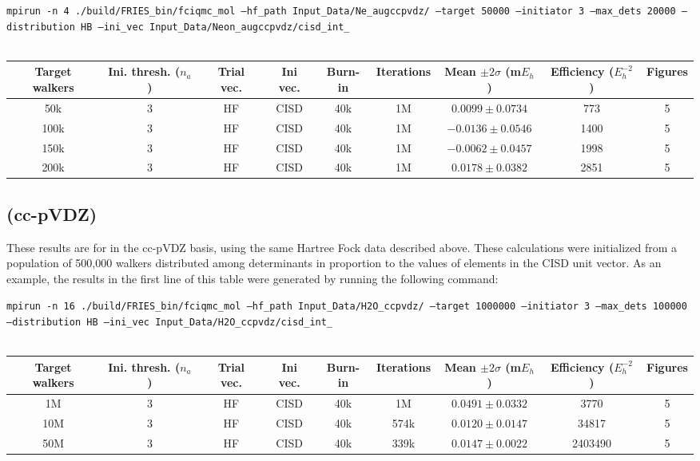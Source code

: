\documentclass[12pt, landscape]{article}
\begin{document}
\texttt{mpirun -n 4 ./build/FRIES\_bin/fciqmc\_mol --hf\_path Input\_Data/Ne\_augccpvdz/ --target 50000 --initiator 3 --max\_dets 20000 --distribution HB --ini\_vec Input\_Data/Neon\_augccpvdz/cisd\_int\_}
\\~\\
\begin{tabular}{c|c|c|c|c|c|c|c|c}
Target walkers & Ini. thresh. ($n_a$) & Trial vec. & Ini vec. & Burn-in & Iterations & Mean $\pm 2 \sigma$ (m$E_h$) & Efficiency ($E_h^{-2}$) & Figures \\ \hline
50k & 3 & HF & CISD & 40k & 1M & $0.0099 \pm 0.0734$ & 773 & 5 \\
100k & 3 & HF & CISD & 40k & 1M & $-0.0136 \pm 0.0546$ & 1400 & 5 \\
150k & 3 & HF & CISD & 40k & 1M & $-0.0062 \pm 0.0457$ & 1998 & 5 \\
200k & 3 & HF & CISD & 40k & 1M & $0.0178 \pm 0.0382$ & 2851 & 5 \\
\end{tabular}


\subsection*{ (cc-pVDZ)}
These results are for  in the cc-pVDZ basis, using the same Hartree Fock data described above. These calculations were initialized from a population of 500,000 walkers distributed among determinants in proportion to the values of elements in the CISD unit vector. As an example, the results in the first line of this table were generated by running the following command:

\texttt{mpirun -n 16 ./build/FRIES\_bin/fciqmc\_mol --hf\_path Input\_Data/H2O\_ccpvdz/ --target 1000000 --initiator 3 --max\_dets 100000 --distribution HB --ini\_vec Input\_Data/H2O\_ccpvdz/cisd\_int\_}
\\~\\
\begin{tabular}{c|c|c|c|c|c|c|c|c}
Target walkers & Ini. thresh. ($n_a$) & Trial vec. & Ini vec. & Burn-in & Iterations & Mean $\pm 2 \sigma$ (m$E_h$) & Efficiency ($E_h^{-2}$) & Figures \\ \hline
1M & 3 & HF & CISD & 40k & 1M & $0.0491 \pm 0.0332$ & 3770 & 5\\
10M & 3 & HF & CISD & 40k & 574k & $0.0120 \pm 0.0147$ & 34817 & 5\\
50M & 3 & HF & CISD & 40k & 339k & $0.0147 \pm 0.0022$ & 2403490 & 5 \\
\end{tabular}
\end{document}
